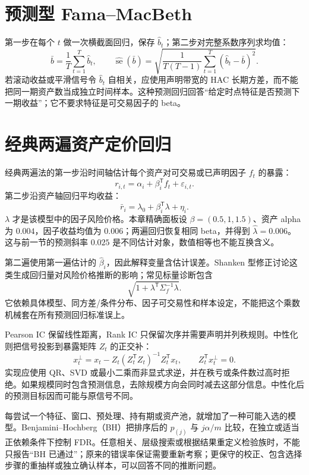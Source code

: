\section{预测型 Fama--MacBeth}

第一步在每个 $t$ 做一次横截面回归，保存 $\hat b_t$；第二步对完整系数序列求均值：
\[
\bar b=\frac1T\sum_{t=1}^T\hat b_t,
\qquad
\widehat{\operatorname{se}}(\bar b)
=\sqrt{\frac{1}{T(T-1)}\sum_{t=1}^T(\hat b_t-\bar b)^2}.
\]
若滚动收益或平滑信号令 $\hat b_t$ 自相关，应使用声明带宽的 HAC 长期方差，而不能把同一期资产数当成独立时间样本\cite{fama1973risk,newey1987hac}。这种预测回归回答“给定时点特征是否预测下一期收益”；它不要求特征是可交易因子的 beta。

\section{经典两遍资产定价回归}

经典两遍法的第一步沿时间轴估计每个资产对可交易或已声明因子 $f_t$ 的暴露：
\[
r_{i,t}=\alpha_i+\beta_i^{\mathsf T}f_t+\varepsilon_{i,t}.
\]
第二步沿资产轴回归平均收益：
\[
\bar r_i=\lambda_0+\beta_i^{\mathsf T}\lambda+\eta_i.
\]
$\lambda$ 才是该模型中的因子风险价格。本章精确面板设 $\beta=(0.5,1,1.5)$、资产 alpha 为 $0.004$，因子收益均值为 $0.006$；两遍回归恢复相同 beta，并得到 $\hat\lambda=0.006$。这与前一节的预测斜率 $0.025$ 是不同估计对象，数值相等也不能互换含义。



第二遍使用第一遍估计的 $\hat\beta_i$，因此解释变量含估计误差。Shanken 型修正讨论这类生成回归量对风险价格推断的影响；常见标量诊断包含
\[
\sqrt{1+\lambda^{\mathsf T}\Sigma_f^{-1}\lambda}.
\]
它依赖具体模型、同方差/条件分布、因子可交易性和样本设定，不能把这个乘数机械套在所有预测回归标准误上\cite{shanken1992beta}。


Pearson IC 保留线性距离，Rank IC 只保留次序并需要声明并列秩规则。中性化则把信号投影到暴露矩阵 $Z_t$ 的正交补：
\[
x_t^\perp=x_t-Z_t(Z_t^{\mathsf T}Z_t)^{-1}Z_t^{\mathsf T}x_t,
\qquad Z_t^{\mathsf T}x_t^\perp=0.
\]
实现应使用 QR、SVD 或最小二乘而非显式求逆，并在秩亏或条件数过高时拒绝。如果规模同时包含预测信息，去除规模方向会同时减去这部分信息。中性化后的预测目标因而可能与原信号不同。





每尝试一个特征、窗口、预处理、持有期或资产池，就增加了一种可能入选的模型。Benjamini--Hochberg（BH）把排序后的 $p_{(j)}$ 与 $j\alpha/m$ 比较，在独立或适当正依赖条件下控制 FDR\cite{benjamini1995controlling}。任意相关、层级搜索或根据结果重定义检验族时，不能只报告“BH 已通过”；原来的错误率保证需要重新考察；更保守的校正、包含选择步骤的重抽样或独立确认样本，可以回答不同的推断问题。

